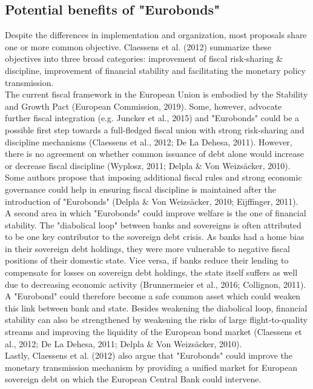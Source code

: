 \subsection{Potential benefits of "Eurobonds"}
Despite the differences in implementation and organization, most proposals share one or more common objective. Claessens et al. (2012) summarize these objectives into three broad categories: improvement of fiscal risk-sharing \& discipline, improvement of financial stability and facilitating the monetary policy transmission.\\
\clearpage
The current fiscal framework in the European Union is embodied by the Stability and Growth Pact (European Commission, 2019). Some, however, advocate further fiscal integration (e.g. Juncker et al., 2015) and "Eurobonds" could be a possible first step towards a full-fledged fiscal union with strong risk-sharing and discipline mechanisms (Claessens et al., 2012; De La Dehesa, 2011). However, there is no agreement on whether common issuance of debt alone would increase or decrease fiscal discipline (Wyplosz, 2011; Delpla \& Von Weizsäcker, 2010). Some authors propose that imposing additional fiscal rules and strong economic governance could help in ensuring fiscal discipline is maintained after the introduction of "Eurobonds" (Delpla \& Von Weizsäcker, 2010; Eijffinger, 2011). \\

A second area in which "Eurobonds" could improve welfare is the one of financial stability. The "diabolical loop" between banks and sovereigns is often attributed to be one key contributor to the sovereign debt crisis. As banks had a home bias in their sovereign debt holdings, they were more vulnerable to negative fiscal positions of their domestic state. Vice versa, if banks reduce their lending to compensate for losses on sovereign debt holdings, the state itself suffers as well due to decreasing economic activity (Brunnermeier et al., 2016; Collignon, 2011). A "Eurobond" could therefore become a safe common asset which could weaken this link between bank and state. Besides weakening the diabolical loop, financial stability can also be strengthened by weakening the risks of large flight-to-quality streams and improving the liquidity of the European bond market (Claessens et al., 2012; De La Dehesa, 2011; Delpla \& Von Weizsäcker, 2010).\\

Lastly, Claessens et al. (2012) also argue that "Eurobonds" could improve the monetary transmission mechanism by providing a unified market for European sovereign debt on which the European Central Bank could intervene.\\
